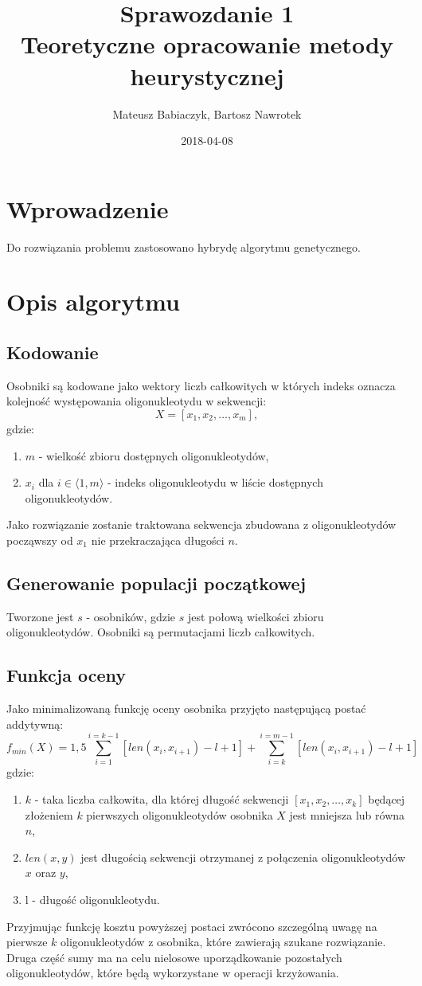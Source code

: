 \documentclass{article}
\title{Sprawozdanie 1 \\ Teoretyczne opracowanie metody heurystycznej}
\date{2018-04-08}
\author{Mateusz Babiaczyk, Bartosz Nawrotek}
\begin{document}
\maketitle
\section{Wprowadzenie}
Do rozwiązania problemu zastosowano hybrydę algorytmu genetycznego.
\section{Opis algorytmu}
\subsection{Kodowanie}
Osobniki są kodowane jako wektory liczb całkowitych w których indeks oznacza kolejność występowania oligonukleotydu w sekwencji:
\begin{equation}
	X = [ x_{1}, x_{2}, \ldots , x_{m}] , 
\end{equation}
gdzie:
\begin{enumerate}
	\item $m$ - wielkość zbioru dostępnych oligonukleotydów,
	\item $x_{i}$ dla $i \in \langle1, m\rangle$ - indeks oligonukleotydu w liście dostępnych oligonukleotydów.
\end{enumerate}
Jako rozwiązanie zostanie traktowana sekwencja zbudowana z oligonukleotydów począwszy od $x_{1}$ nie przekraczająca długości $n$.
\subsection{Generowanie populacji początkowej}
Tworzone jest $s$ - osobników, gdzie $s$ jest połową wielkości zbioru oligonukleotydów.
Osobniki są permutacjami liczb całkowitych.
\subsection{Funkcja oceny}
Jako minimalizowaną funkcję oceny osobnika przyjęto następującą postać addytywną:
\begin{equation}
	f_{min}(X) = 1,5\sum_{i = 1}^{i = k - 1}{[len(x_{i}, x_{i+1}) - l + 1]} + \sum_{i = k}^{i = m - 1}{[len(x_{i}, x_{i+1})- l + 1]}
\end{equation}
gdzie:
\begin{enumerate}
	\item $k$ - taka liczba całkowita, dla której długość sekwencji $[x_{1}, x_{2}, \ldots , x_{k}]$ będącej złożeniem $k$ pierwszych oligonukleotydów osobnika $X$ jest mniejsza lub równa $n$,
	\item $len(x, y)$ jest długością sekwencji otrzymanej z połączenia oligonukleotydów $x$ oraz $y$,
	\item l - długość oligonukleotydu.
\end{enumerate}
Przyjmując funkcję kosztu powyższej postaci zwrócono szczególną uwagę na pierwsze $k$ oligonukleotydów z osobnika, które zawierają szukane rozwiązanie. Druga część sumy ma na celu nielosowe uporządkowanie pozostałych oligonukleotydów, które będą wykorzystane w operacji krzyżowania.
\pagebreak
\end{document}
